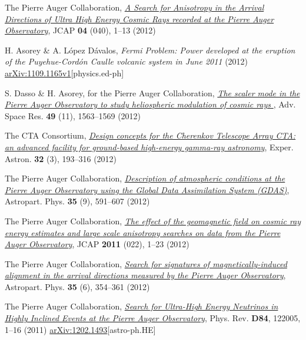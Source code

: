 \begin{etaremune}
\item {}The Pierre Auger Collaboration, 
\href{http://dx.doi.org/10.1088/1475-7516/2012/04/040}{\emph{A Search for
Anisotropy in the Arrival Directions of Ultra High Energy Cosmic Rays recorded
at the Pierre Auger Observatory}}, JCAP {\bf{04}} (040), 1--13 (2012)

\item {}H. Asorey \& A. López Dávalos, {\emph{Fermi Problem: Power
developed at the eruption of the Puyehue-Cordón Caulle volcanic system in June
2011}} (2012)
\href{http://arxiv.org/abs/1109.1165}{arXiv:1109.1165v1}[physics.ed-ph]

\item {}S. Dasso \& H. Asorey, for the Pierre Auger Collaboration,
\href{http://dx.doi.org/10.1016/j.asr.2011.12.028}{\emph{ The scaler mode in
the Pierre Auger Observatory to study heliospheric modulation of cosmic rays
}}, Adv. Space Res. {\bf{49}} (11), 1563--1569 (2012)

\item {}The CTA Consortium,
\href{http://dx.doi.org/10.1007/s10686-011-9247-0}{\emph{Design concepts for
the Cherenkov Telescope Array CTA: an advanced facility for ground-based
high-energy gamma-ray astronomy}}, Exper. Astron. {\bf{32}} (3), 193--316
(2012)

\item {}The Pierre Auger Collaboration, 
\href{http://dx.doi.org/10.1016/j.astropartphys.2011.12.002}{\emph{Description
of atmospheric conditions at the Pierre Auger Observatory using the Global Data
Assimilation System (GDAS)}}, Astropart. Phys. {\bf{35}} (9), 591--607 (2012)

\item {}The Pierre Auger Collaboration, 
\href{http://dx.doi.org/10.1088/1475-7516/2011/11/022}{\emph{The effect of the
geomagnetic field on cosmic ray energy estimates and large scale anisotropy
searches on data from the Pierre Auger Observatory}}, JCAP {\bf{2011}} (022),
1--23 (2012)

\item {}The Pierre Auger Collaboration, 
\href{http://dx.doi.org/10.1016/j.astropartphys.2011.10.004}{\emph{Search for
signatures of magnetically-induced alignment in the arrival directions measured
by the Pierre Auger Observatory}}, Astropart. Phys. {\bf{35}} (6), 354--361
(2012)

\item {}The Pierre Auger Collaboration,
\href{http://dx.doi.org/10.1016/10.1103/PhysRevD.84.122005}{\emph{Search for
Ultra-High Energy Neutrinos in Highly Inclined Events at the Pierre Auger
Observatory}}, Phys.  Rev. {\bf D84}, 122005, 1--16 (2011)
\href{http://arxiv.org/abs/1202.1493}{arXiv:1202.1493}[astro-ph.HE]


\end{etaremune}
